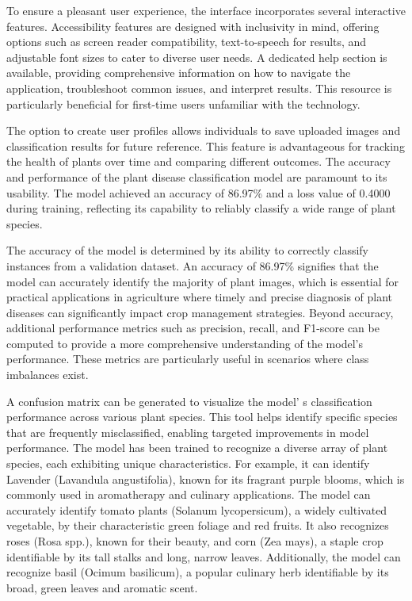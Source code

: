 {{To ensure a pleasant user experience, the interface incorporates several
interactive features. Accessibility features are designed with
inclusivity in mind, offering options such as screen reader
compatibility, text-to-speech for results, and adjustable font sizes to
cater to diverse user needs. A dedicated help section is available,
providing comprehensive information on how to navigate the application,
troubleshoot common issues, and interpret results. This resource is
particularly beneficial for first-time users unfamiliar with the
technology.

The option to create user profiles allows individuals to save uploaded
images and classification results for future reference. This feature is
advantageous for tracking the health of plants over time and comparing
different outcomes. The accuracy and performance of the plant disease
classification model are paramount to its usability. The model achieved
an accuracy of 86.97\% and a loss value of 0.4000 during training,
reflecting its capability to reliably classify a wide range of plant
species.

The accuracy of the model is determined by its ability to correctly
classify instances from a validation dataset. An accuracy of 86.97\%
signifies that the model can accurately identify the majority of plant
images, which is essential for practical applications in agriculture
where timely and precise diagnosis of plant diseases can significantly
impact crop management strategies. Beyond accuracy, additional
performance metrics such as precision, recall, and F1-score can be
computed to provide a more comprehensive understanding of the model's
performance. These metrics are particularly useful in scenarios where
class imbalances exist.

A confusion matrix can be generated to visualize the
model' s classification performance across various plant
species. This tool helps identify specific species that are frequently
misclassified, enabling targeted improvements in model performance. The
model has been trained to recognize a diverse array of plant species,
each exhibiting unique characteristics. For example, it can identify
Lavender (Lavandula angustifolia), known for its fragrant purple blooms,
which is commonly used in aromatherapy and culinary applications. The
model can accurately identify tomato plants (Solanum lycopersicum), a
widely cultivated vegetable, by their characteristic green foliage and
red fruits. It also recognizes roses (Rosa spp.), known for their
beauty, and corn (Zea mays), a staple crop identifiable by its tall
stalks and long, narrow leaves. Additionally, the model can recognize
basil (Ocimum basilicum), a popular culinary herb identifiable by its
broad, green leaves and aromatic scent.

}}
